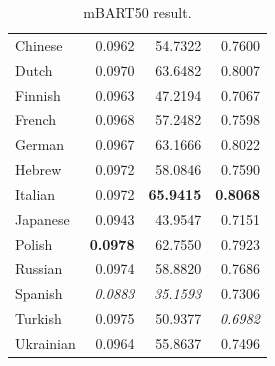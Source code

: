 \documentclass[a4paper, 11pt]{article}
\begin{document}
\begin{table}[htbp]
\begin{minipage}{0.49\linewidth}
\begin{tabular}{lrrr}
            \hline
            Chinese           & 0.0962          & 54.7322            & 0.7600          \\
            Dutch             & 0.0970          & 63.6482            & 0.8007          \\
            Finnish           & 0.0963          & 47.2194            & 0.7067          \\
            French            & 0.0968          & 57.2482            & 0.7598          \\
            German            & 0.0967          & 63.1666            & 0.8022          \\
            Hebrew            & 0.0972          & 58.0846            & 0.7590          \\
            Italian           & 0.0972          & \textbf{65.9415}   & \textbf{0.8068} \\
            Japanese          & 0.0943          & 43.9547            & 0.7151          \\
            Polish            & \textbf{0.0978} & 62.7550            & 0.7923          \\
            Russian           & 0.0974          & 58.8820            & 0.7686          \\
            Spanish           & \textit{0.0883} & \textit{35.1593}   & 0.7306          \\
            Turkish           & 0.0975          & 50.9377            & \textit{0.6982} \\
            Ukrainian         & 0.0964          & 55.8637            & 0.7496          \\
            \hline
        \end{tabular}
        \caption{mBART50 result.}
        \label{table:mbart_result}
    \end{minipage}
\end{table}
\end{document}

